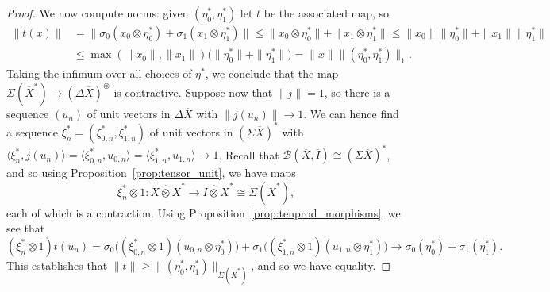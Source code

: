 \documentclass[a4paper,11pt]{article}
\theoremstyle{plain}
\theoremstyle{remark}
\newcommand{\mc}[1]{\mathcal{#1}}
\newcommand{\ip}[2]{{\langle {#1} , {#2} \rangle}}
\newcommand{\proten}{\widehat\otimes}
\newcommand{\intdual}{\circledast}
\begin{document}
\begin{proof}
We now compute norms: given $(\eta_0^*, \eta_1^*)$ let $t$ be the associated map, so
\begin{align*}
\|t(x)\| &= \| \sigma_0(x_0\otimes\eta_0^*) + \sigma_1(x_1\otimes\eta_1^*) \|
\leq \|x_0\otimes\eta_0^*\| + \|x_1\otimes\eta_1^*\|
\leq \|x_0\|\|\eta_0^*\| + \|x_1\|\|\eta_1^*\|   \\
&\leq \max(\|x_0\|, \|x_1\|) \big( \|\eta_0^*\| + \|\eta_1^*\| \big)
= \|x\| \| (\eta_0^*, \eta_1^*) \|_1.
\end{align*}
Taking the infimum over all choices of $\eta^*$, we conclude that the map $\Sigma(\overline X^*) \to (\Delta\overline X)^\intdual$ is contractive.  Suppose now that $\|j\|=1$, so there is a sequence $(u_n)$ of unit vectors in $\Delta\overline X$ with $\|j(u_n)\| \to 1$.
We can hence find a sequence $\xi_n^* = (\xi_{0,n}^*, \xi_{1,n}^*)$ of unit vectors in $(\Sigma\overline X)^*$ with $\ip{\xi_n^*}{j(u_n)} = \ip{\xi_{0,n}^*}{u_{0,n}} = \ip{\xi_{1,n}^*}{u_{1,n}} \to 1$.  Recall that $\mc B(\overline X,\overline I) \cong (\Sigma\overline X)^*$, and so using Proposition~\ref{prop:tensor_unit}, we have maps
\[ \xi_n^* \otimes \overline 1 \colon \overline X \proten \overline X^*
\to \overline I \proten \overline X^* \cong \Sigma(\overline X^*), \]
each of which is a contraction.  Using Proposition~\ref{prop:tenprod_morphisms}, we see that
\[ (\xi_n^* \otimes \overline 1) t (u_n)
= \sigma_0\big( (\xi_{0,n}^*\otimes 1)(u_{0,n}\otimes \eta_0^*) \big) + 
\sigma_1\big( (\xi_{1,n}^*\otimes 1)(u_{1,n}\otimes \eta_1^*) \big)
\to \sigma_0(\eta_0^*) + \sigma_1(\eta_1^*). \]
This establishes that $\|t\| \geq \|(\eta_0^*, \eta_1^*)\|_{\Sigma(\overline X^*)}$, and so we have equality.
\end{proof}
\end{document}
